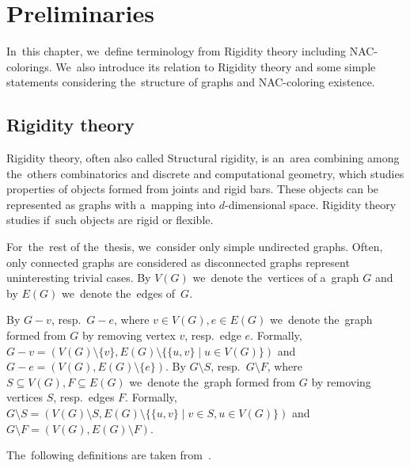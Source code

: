 
\chapter{Preliminaries}%
\label{chapter:preliminaries}

\begin{chapterabstract}

	In~this chapter, we~define terminology from Rigidity theory including NAC-colorings.
	We~also introduce its relation to Rigidity theory and
	some simple statements considering
	the~structure of graphs and NAC-coloring existence.

\end{chapterabstract}

\section{Rigidity theory}

Rigidity theory, often also called Structural rigidity,
is an~area combining among the~others
combinatorics and discrete and computational geometry,
which studies properties of objects formed from joints and rigid bars.
These objects can be represented as graphs with
a~mapping into \( d \)-dimensional space.
Rigidity theory studies if~such objects are rigid or flexible.

For~the~rest of the~thesis,
we~consider only simple undirected graphs.
Often, only connected graphs are considered as disconnected graphs
represent uninteresting trivial cases.
By \( V(G) \) we~denote the~vertices of a~graph \( G \) and
by \( E(G) \) we~denote the~edges of~\( G \).

By \( G - v \), resp.\ \( G - e \),
where \( v \in V(G), e \in E(G) \) we~denote the~graph
formed from \( G \) by removing vertex \( v \), resp.\ edge \( e \).
Formally,
\( G - v = (V(G) \setminus \{v\}, E(G) \setminus \{\{u, v\} \mid u \in V(G)\}) \)
and \( G - e = (V(G), E(G) \setminus \{e\}) \).
%
By \( G \setminus S \), resp.\ \( G \setminus F \),
where \( S \subseteq V(G), F \subseteq E(G) \) we~denote the~graph
formed from \( G \) by removing vertices \( S \), resp.\ edges \( F \).
Formally,
\( G \setminus S = (V(G) \setminus S, E(G) \setminus \{\{u, v\} \mid v \in S, u \in V(G)\}) \)
and \( G \setminus F = (V(G), E(G) \setminus F) \).

The~following definitions are taken from~\cite{np_complete,my_paper}.

